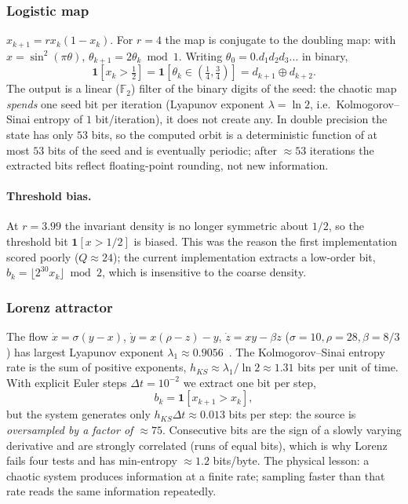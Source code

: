 \documentclass[11pt,a4paper]{article}
\theoremstyle{plain}
\theoremstyle{definition}
\begin{document}
\subsubsection{Logistic map}

$x_{k+1}=r x_k(1-x_k)$. For $r=4$ the map is conjugate to the doubling map:
with $x=\sin^2(\pi\theta)$, $\theta_{k+1}=2\theta_k \bmod 1$. Writing
$\theta_0=0.d_1d_2d_3\ldots$ in binary,
\begin{equation}
    \mathbf{1}[x_k>\tfrac12]=\mathbf{1}[\theta_k\in(\tfrac14,\tfrac34)]=d_{k+1}\oplus d_{k+2}.
\end{equation}
The output is a linear ($\mathbb{F}_2$) filter of the binary digits of the seed:
the chaotic map \emph{spends} one seed bit per iteration (Lyapunov exponent
$\lambda=\ln 2$, i.e.\ Kolmogorov--Sinai entropy of $1$ bit/iteration), it does
not create any. In double precision the state has only $53$ bits, so the computed orbit is a
deterministic function of at most $53$ bits of the seed and is eventually
periodic; after $\approx53$ iterations the extracted bits reflect
floating-point rounding, not new information.

\paragraph{Threshold bias.} At $r=3.99$ the invariant density is no longer
symmetric about $1/2$, so the threshold bit $\mathbf{1}[x>1/2]$ is biased.
This was the reason the first implementation scored poorly ($Q\approx24$); the
current implementation extracts a low-order bit,
$b_k=\lfloor 2^{30}x_k\rfloor \bmod 2$, which is insensitive to the coarse
density.

\subsubsection{Lorenz attractor}

The flow $\dot x=\sigma(y-x)$, $\dot y=x(\rho-z)-y$, $\dot z=xy-\beta z$
($\sigma=10,\rho=28,\beta=8/3$) has largest Lyapunov exponent
$\lambda_1\approx0.9056$~\cite{lorenz63}. The Kolmogorov--Sinai entropy rate is
the sum of positive exponents, $h_{KS}\approx\lambda_1/\ln2\approx1.31$
bits per unit of time. With explicit Euler steps $\Delta t=10^{-2}$ we extract
one bit per step,
\begin{equation}
    b_k=\mathbf{1}[x_{k+1}>x_k],
\end{equation}
but the system generates only $h_{KS}\Delta t\approx0.013$ bits per step:
the source is \emph{oversampled by a factor of $\approx75$}. Consecutive bits
are the sign of a slowly varying derivative and are strongly correlated (runs
of equal bits), which is why Lorenz fails four tests and has min-entropy
$\approx1.2$ bits/byte. The physical lesson: a chaotic system produces
information at a finite rate; sampling faster than that rate reads the same
information repeatedly.
\end{document}
